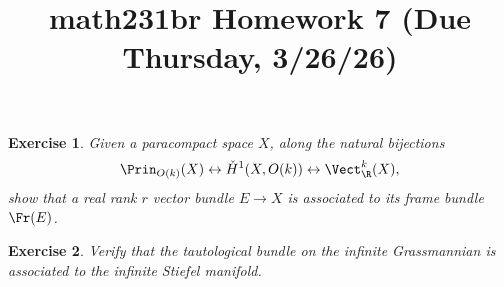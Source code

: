 \documentclass[11pt]{amsart}
\title{math231br Homework 7 (Due Thursday, 3/26/26)}
\newtheorem{hwexercise}{Exercise}
\begin{document}
\maketitle

\begin{hwexercise}
Given a paracompact space $X$, along the natural bijections
\begin{align*}
    \Prin_{O(k)}(X) \leftrightarrow \check{H}^1(X,O(k)) \leftrightarrow \Vect_\R^k(X),
\end{align*}
show that a real rank $r$ vector bundle $E \to X$ is associated to its frame bundle $\Fr(E)$.
\end{hwexercise}

\begin{hwexercise}
Verify that the \emph{tautological} bundle on the infinite Grassmannian is associated to the infinite Stiefel manifold.
\end{hwexercise}
\end{document}
